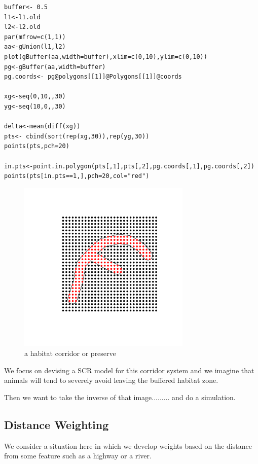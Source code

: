 \begin{verbatim}
buffer<- 0.5
l1<-l1.old
l2<-l2.old
par(mfrow=c(1,1))
aa<-gUnion(l1,l2)
plot(gBuffer(aa,width=buffer),xlim=c(0,10),ylim=c(0,10))
pg<-gBuffer(aa,width=buffer)
pg.coords<- pg@polygons[[1]]@Polygons[[1]]@coords

xg<-seq(0,10,,30)
yg<-seq(10,0,,30)

delta<-mean(diff(xg))
pts<- cbind(sort(rep(xg,30)),rep(yg,30))
points(pts,pch=20)

in.pts<-point.in.polygon(pts[,1],pts[,2],pg.coords[,1],pg.coords[,2])
points(pts[in.pts==1,],pch=20,col="red")

\end{verbatim}

\begin{figure}
\begin{center}
\includegraphics[height=3.25in,width=3.25in]{Ch10/figs/corridor}
\end{center}
\caption{a habitat corridor or preserve}
\label{ecoldist.fig.corridor}
\end{figure}


We focus on devising a SCR model for this corridor system and we
imagine that animals will tend to severely avoid leaving the buffered
habitat zone.


Then we want to take the inverse of that image......... and do a simulation.

\subsection{Distance Weighting}

We consider a situation here in which we develop weights based on the
distance from some feature such as a highway or a river. 

